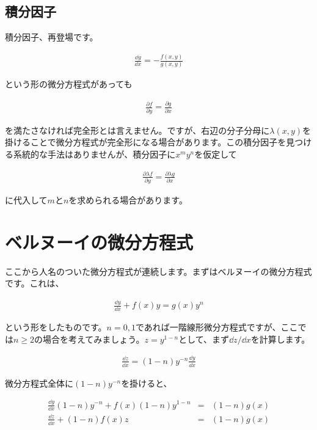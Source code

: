 \subsection{積分因子}
\label{perfect-integrating-factor}
積分因子、再登場です。

\begin{eqnarray}
    \frac{\dd y}{\dd x}=-\frac{f(x,y)}{g(x,y)} \nonumber
\end{eqnarray}

\noindent
という形の微分方程式があっても

\begin{eqnarray}
    \frac{\partial f}{\partial y}=\frac{\partial g}{\partial x} \nonumber
\end{eqnarray}

\noindent
を満たさなければ完全形とは言えません。ですが、右辺の分子分母に$\lambda(x,y)$を掛けることで微分方程式が完全形になる場合があります。この積分因子を見つける系統的な手法はありませんが、積分因子に$x^my^n$を仮定して

\begin{eqnarray}
    \frac{\partial \lambda f}{\partial y}=\frac{\partial \lambda g}{\partial x}
\end{eqnarray}

\noindent
に代入して$m$と$n$を求められる場合があります。








\section{ベルヌーイの微分方程式}
\label{bernoulli}
ここから人名のついた微分方程式が連続します。まずはベルヌーイの微分方程式です。これは、

\begin{eqnarray}
    \frac{\dd y}{\dd x}+f(x)y=g(x)y^n
\end{eqnarray}

\noindent
という形をしたものです。$n=0,1$であれば一階線形微分方程式ですが、ここでは$n\geq2$の場合を考えてみましょう。$z=y^{1-n}$として、まず$\dd z/\dd x$を計算します。

\begin{eqnarray}
    \frac{\dd z}{\dd x}=(1-n)y^{-n}\frac{\dd y}{\dd x}
\end{eqnarray}

微分方程式全体に$(1-n)y^{-n}$を掛けると、

\begin{eqnarray}
    \frac{\dd y}{\dd x}(1-n)y^{-n}+f(x)(1-n)y^{1-n}&=&(1-n)g(x) \\
    \frac{\dd z}{\dd x}+(1-n)f(x)z&=&(1-n)g(x)
\end{eqnarray}

